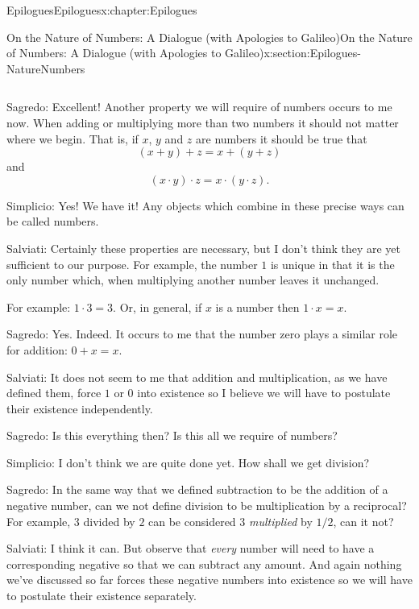 \begin{chapterptx}{Epilogues}{}{Epilogues}{}{}{x:chapter:Epilogues}
\begin{sectionptx}{On the Nature of Numbers: A Dialogue (with Apologies to Galileo)}{}{On the Nature of Numbers: A Dialogue (with Apologies to Galileo)}{}{}{x:section:Epilogues-NatureNumbers}
\begin{introduction}{}
\begin{equation*}
			\end{equation*}
			\par
			\alert{Sagredo}:  Excellent! Another property we will require of numbers occurs to me now. When adding or multiplying more than two numbers it should not matter where we begin. That is, if \(x\), \(y\) and \(z\) are numbers it should be true that%
			\begin{equation*}
				(x+y)+z = x+(y+z)
			\end{equation*}
			and%
			\begin{equation*}
				(x\cdot y)\cdot z = x\cdot(y\cdot z)\text{.}
			\end{equation*}
			\par
			\alert{Simplicio}:  Yes! We have it! Any objects which combine in these precise ways can be called numbers.%
			\par
			\alert{Salviati}:  Certainly these properties are necessary, but I don't think they are yet sufficient to our purpose. For example, the number \(1\) is unique in that it is the only number which, when multiplying another number leaves it unchanged.%
			\par
			For example:  \(1\cdot3=3\). Or, in general, if \(x\) is a number then \(1\cdot x =x\).%
			\par
			\alert{Sagredo}:  Yes. Indeed. It occurs to me that the number zero plays a similar role for addition: \(0+x=x\).%
			\par
			\alert{Salviati}:  It does not seem to me that addition and multiplication, as we have defined them, force \(1\) or \(0\) into existence so I believe we will have to postulate their existence independently.%
			\par
			\alert{Sagredo}:  Is this everything then? Is this all we require of numbers?%
			\par
			\alert{Simplicio}:  I don't think we are quite done yet. How shall we get division?%
			\par
			\alert{Sagredo}:  In the same way that we defined subtraction to be the addition of a negative number, can we not define division to be multiplication by a reciprocal? For example, \(3\) divided by \(2\) can be considered \(3\) \emph{multiplied} by \(1/2\), can it not?%
			\par
			\alert{Salviati}:  I think it can. But observe that \emph{every} number will need to have a corresponding negative so that we can subtract any amount. And again nothing we've discussed so far forces these negative numbers into existence so we will have to postulate their existence separately.%

\end{introduction}
\end{sectionptx}
\end{chapterptx}
